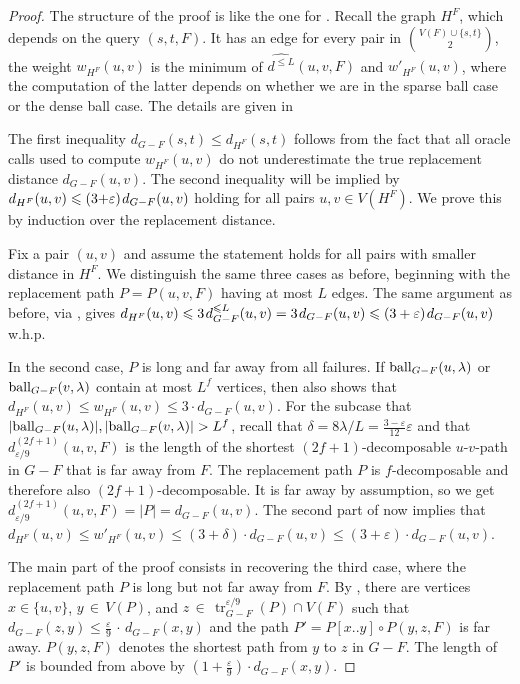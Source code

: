 \documentclass{theoretics}
\DeclareMathOperator{\tr}{tr}
\newcommand*{\length}[1]{|#1|}
\newcommand*{\ball}{\mbox{\rm ball}}
\newcommand*{\nwspace}{\hspace*{.1em}}
\renewcommand{\le}{\leqslant}
\newcommand{\eps}{\varepsilon}
\begin{document}
\begin{proof}
	The structure of the proof is like the one for .
	Recall the graph $H^F$, which depends on the query $(s,t,F)$.
	It has an edge for every pair in $\binom{V(F) \cup \{s,t\}}{2}$,
	  the weight $w_{H^F}(u,v)$ is the minimum of $\widehat{d^{\le L}}(u,v,F)$
	and $w'_{H^F}(u,v)$, where the computation of the latter depends on whether
	we are in the sparse ball case or the dense ball case.
	The details are given in 
	
	The first inequality $d_{G-F}(s,t) \le d_{H^F}(s,t)$ follows from the fact that all oracle calls used to compute $w_{H^F}(u,v)$ do not underestimate
	the true replacement distance $d_{G-F}(u,v)$.
%	
	The second inequality will be implied by $d_{H^F}(u,v) \le (3{+}\eps) \nwspace d_{G-F}(u,v)$
	holding for all pairs $u,v \in V(H^F)$.
    We prove this by induction over the replacement distance.
 
    Fix a pair $(u,v)$ 
    and assume the statement holds for all pairs with smaller distance in $H^F$.
	We distinguish the same three cases as before,
 	beginning with the replacement path $P = P(u,v,F)$ having at most $L$ edges.
 	The same argument as before, via , gives
    $d_{H^F}(u,v) \le 3 \nwspace d_{G-F}^{\le L}(u,v) = 3 \nwspace d_{G-F}(u,v) 
    	\le (3+\varepsilon) \nwspace d_{G-F}(u,v)$ w.h.p.

	In the second case, $P$ is long and far away from all failures.
	If $\ball_{G-F}(u,\lambda)$ or $\ball_{G-F}(v,\lambda)$ contain at most $L^f$ vertices,
	then  also shows that
	$d_{H^F}(u,v) \le w_{H^F}(u,v) \le 3 \cdot d_{G-F}(u,v)$.
	For the subcase that $|\ball_{G-F}(u,\lambda)|, |\ball_{G-F}(v,\lambda)| > L^f$,
	recall that $\delta = 8\lambda/L = \frac{3-\varepsilon}{12} \varepsilon$
	and that $d_{\varepsilon/9}^{(2f+1)}(u,v,F)$ is the length of the shortest $(2f{+}1)$-decomposable
	$u$-$v$-path in $G-F$ that is far away from $F$.
	The replacement path $P$ is $f$-decomposable and therefore also $(2f{+}1)$-decomposable.
	It is far away by assumption, so we get
	$d_{\varepsilon/9}^{(2f+1)}(u,v,F) = \length{P} = d_{G-F}(u,v)$.
	The second part of  now implies that
	$d_{H^F}(u,v) \le w'_{H^F}(u,v) \le (3+\delta) \cdot d_{G-F}(u,v) 
		\le (3+\varepsilon) \cdot d_{G-F}(u,v)$.
  
	The main part of the proof consists in recovering the third case,
	where the replacement path $P$ is long but not far away from $F$.
	By , there are vertices $x \in \{u,v\}$, $y \,{\in}\, V(P)$,
	and $z \,{\in}\, \tr^{\eps/9}_{G-F}(P) \cap V(F)$
	such that $d_{G-F}(z,y) \le \tfrac{\eps}{9} \,{\cdot}\, d_{G-F}(x,y)$
	and the path $P' = P[x..y] \circ P(y,z,F)$ is far away.
	$P(y,z,F)$ denotes the shortest path from $y$ to $z$ in $G-F$.
  	The length of $P'$ is bounded from above by \mbox{$(1+ \tfrac{\eps}{9}) \cdot d_{G-F}(x,y)$}.


\end{proof}
\end{document}
